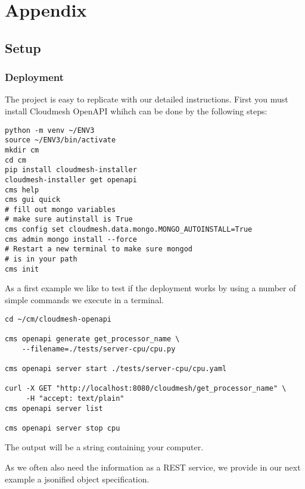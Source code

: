 \appendix

\section{Appendix}

\subsection{Setup}\label{appendix-a.---setup}

\subsubsection{Deployment}\label{a.1.-deployment}

The project is easy to replicate with our detailed instructions. First
you must install Cloudmesh OpenAPI whihch can be done by the following
steps:


\begin{verbatim}
python -m venv ~/ENV3
source ~/ENV3/bin/activate 
mkdir cm
cd cm
pip install cloudmesh-installer
cloudmesh-installer get openapi 
cms help
cms gui quick
# fill out mongo variables
# make sure autinstall is True
cms config set cloudmesh.data.mongo.MONGO_AUTOINSTALL=True
cms admin mongo install --force
# Restart a new terminal to make sure mongod 
# is in your path
cms init
\end{verbatim}
 

As a first example we like to test if the deployment works by using a
number of simple commands we execute in a terminal.

\begin{verbatim}
cd ~/cm/cloudmesh-openapi

cms openapi generate get_processor_name \
    --filename=./tests/server-cpu/cpu.py

cms openapi server start ./tests/server-cpu/cpu.yaml

curl -X GET "http://localhost:8080/cloudmesh/get_processor_name" \
     -H "accept: text/plain"
cms openapi server list

cms openapi server stop cpu
\end{verbatim}

The output will be a string containing your computer.



As we often also need the information as a REST service, we provide in
our next example a jsonified object specification.

